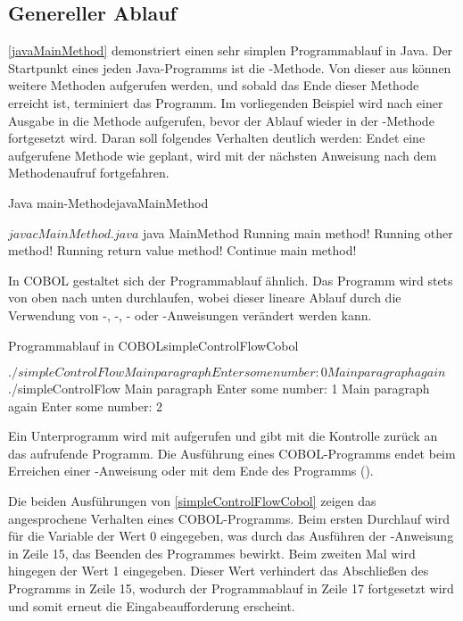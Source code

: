\subsection{Genereller Ablauf} \label{generalablauf}

\autoref{javaMainMethod} demonstriert einen sehr simplen Programmablauf in Java. Der Startpunkt eines jeden Java-Programms ist die -Methode. Von dieser aus können weitere Methoden aufgerufen werden, und sobald das Ende dieser Methode erreicht ist, terminiert das Programm. Im vorliegenden Beispiel wird nach einer Ausgabe in  die Methode  aufgerufen, bevor der Ablauf wieder in der -Methode fortgesetzt wird. Daran soll folgendes Verhalten deutlich werden: Endet eine aufgerufene Methode wie geplant, wird mit der nächsten Anweisung nach dem Methodenaufruf fortgefahren. 

\begin{codeWithCaption}{Java main-Methode}{javaMainMethod}
\begin{shellwindow}
$ javac MainMethod.java 
$ java MainMethod
Running main method!
Running other method!
Running return value method!
Continue main method!
\end{shellwindow}
\end{codeWithCaption}

In COBOL gestaltet sich der Programmablauf ähnlich. Das Programm wird stets von oben nach unten durchlaufen, wobei dieser lineare Ablauf \zB durch die Verwendung von -, -, - oder -Anweisungen verändert werden kann.

\begin{codeWithCaption}{Programmablauf in COBOL}{simpleControlFlowCobol}
\begin{shellwindow}
$ ./simpleControlFlow 
Main paragraph
Enter some number: 0
Main paragraph again
$ ./simpleControlFlow 
Main paragraph
Enter some number: 1 
Main paragraph again
Enter some number: 2
\end{shellwindow}
\end{codeWithCaption}

Ein Unterprogramm wird mit  aufgerufen und gibt mit  die Kontrolle zurück an das aufrufende Programm. Die Ausführung eines COBOL-Programms endet beim Erreichen einer -Anweisung oder mit dem Ende des Programms (). 

Die beiden Ausführungen von \autoref{simpleControlFlowCobol} zeigen das angesprochene Verhalten eines COBOL-Programms. Beim ersten Durchlauf wird für die Variable  der Wert 0 eingegeben, was durch das Ausführen der -Anweisung in Zeile 15, das Beenden des Programmes bewirkt. Beim zweiten Mal wird hingegen der Wert 1 eingegeben. Dieser Wert verhindert das Abschließen des Programms in Zeile 15, wodurch der Programmablauf in Zeile 17 fortgesetzt wird und somit erneut die Eingabeaufforderung erscheint.

